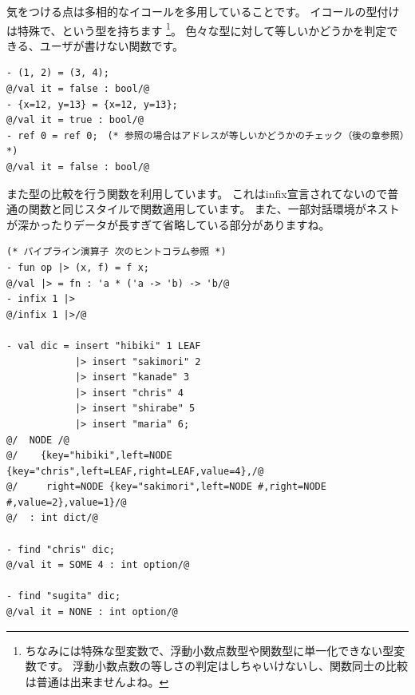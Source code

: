 \documentclass[11pt,a4paper]{jarticle}
\begin{document}

気をつける点は多相的なイコールを多用していることです。
イコールの型付けは特殊で、という型を持ちます
\footnote{ちなみには特殊な型変数で、浮動小数点数型や関数型に単一化できない型変数です。
浮動小数点数の等しさの判定はしちゃいけないし、関数同士の比較は普通は出来ませんよね。}。
色々な型に対して等しいかどうかを判定できる、ユーザが書けない関数です。

\begin{lstlisting}[caption=イコールを乱用する,label=code:equal]
- (1, 2) = (3, 4);
@/val it = false : bool/@
- {x=12, y=13} = {x=12, y=13};
@/val it = true : bool/@
- ref 0 = ref 0;　(* 参照の場合はアドレスが等しいかどうかのチェック（後の章参照）*)
@/val it = false : bool/@
\end{lstlisting}

また型の比較を行う関数を利用しています。
これはinfix宣言されてないので普通の関数と同じスタイルで関数適用しています。
また、一部対話環境がネストが深かったりデータが長すぎて省略している部分がありますね。

\begin{lstlisting}[caption=dict型の利用,label=code:use-dict]
(* パイプライン演算子 次のヒントコラム参照 *)
- fun op |> (x, f) = f x;
@/val |> = fn : 'a * ('a -> 'b) -> 'b/@
- infix 1 |>
@/infix 1 |>/@

- val dic = insert "hibiki" 1 LEAF
            |> insert "sakimori" 2
            |> insert "kanade" 3
            |> insert "chris" 4
            |> insert "shirabe" 5
            |> insert "maria" 6;
@/  NODE /@
@/    {key="hibiki",left=NODE {key="chris",left=LEAF,right=LEAF,value=4},/@
@/     right=NODE {key="sakimori",left=NODE #,right=NODE #,value=2},value=1}/@
@/  : int dict/@

- find "chris" dic;
@/val it = SOME 4 : int option/@

- find "sugita" dic;
@/val it = NONE : int option/@
\end{lstlisting}
\end{document}
